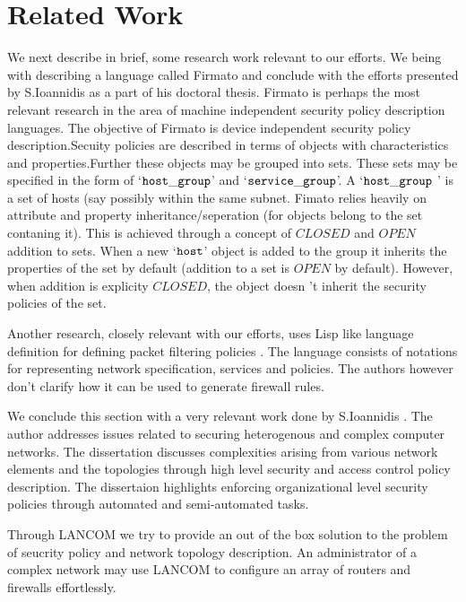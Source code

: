 \section{Related Work}
 \label{sec:related_work}

We next describe in brief, some research work relevant to our efforts.
  We being with describing a language called Firmato and conclude with the
  efforts presented by S.Ioannidis as a part of his doctoral thesis. 
  Firmato \cite{bartal99firmato} is perhaps the most relevant research in the area 
  of machine independent security policy description languages.  The objective of 
  Firmato is device independent security policy description.Secuity policies are 
  described in terms of objects with characteristics and properties.Further these 
  objects may be grouped into sets. These sets may be specified in the form of 
  `${\tt host\_group}$' and `${\tt service\_group}$'. A `${\tt host\_group}$ '
    is a set of hosts (say possibly within the same subnet. Fimato relies heavily 
  on attribute and property inheritance/seperation (for objects belong to the set contaning it). 
  This is achieved through a concept of $CLOSED$ and $OPEN$ addition to sets. When a new `${\tt host}$' 
  object is added to the group it inherits the properties of the set by default (addition to a set is $OPEN$ by default).
  However, when addition is explicity $CLOSED$, the object doesn 't inherit the security policies of the set.

Another research, closely relevant with our efforts, uses Lisp like language definition for 
defining packet filtering policies \cite{guttmanfiltering}. The language consists of notations
 for representing network specification, services and policies.  The authors however don't
 clarify how it can be used to generate firewall rules.

We conclude this section with a very relevant work done by S.Ioannidis \cite{ioannidis}.
The author addresses issues related to securing heterogenous and complex computer networks.
The dissertation discusses complexities arising from various network elements and the 
topologies through high level security and access control policy description.
The dissertaion highlights enforcing organizational level security policies
through automated and semi-automated tasks. 

Through LANCOM we try to provide an out of the box solution to the problem of seucrity policy and network topology 
description. An administrator of a complex network may use LANCOM to configure an array of routers and firewalls effortlessly.
